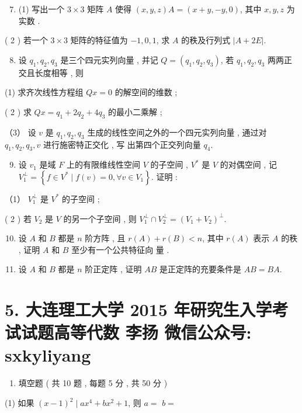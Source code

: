 \documentclass[10pt]{article}
\begin{document}
{\begin{enumerate}
  \setcounter{enumi}{6}
  \item (1)  写出一个  $3 \times 3$  矩阵  $A$  使得  $(x, y, z) A=(x+y,-y, 0)$,  其中  $x, y, z$  为实数 .
\end{enumerate}
( 2 )  若一个  $3 \times 3$  矩阵的特征值为  $-1,0,1$,  求  $A$  的秩及行列式  $|A+2 E|$.

\begin{enumerate}
  \setcounter{enumi}{7}
  \item  设  $q_{1}, q_{2}, q_{3}$  是三个四元实列向量 ,  并记  $Q=\left(q_{1}, q_{2}, q_{3}\right)$,  若  $q_{1}, q_{2}, q_{3}$  两两正交且长度相等 ,  则 
\end{enumerate}
(1)  求齐次线性方程组  $Q x=0$  的解空间的维数 ;

( 2 )  求  $Q x=q_{1}+2 q_{2}+4 q_{3}$  的最小二乘解 ;

（3） 设  $v$  是  $q_{1}, q_{2}, q_{3}$  生成的线性空间之外的一个四元实列向量 ,  通过对  $q_{1}, q_{2}, q_{3}, v$  进行施密特正交化 ,  写   出第四个正交列向量  $q_{4}$.

\begin{enumerate}
  \setcounter{enumi}{8}
  \item  设  $v_{1}$  是域  $F$  上的有限维线性空间  $V$  的子空间 , $V^{*}$  是  $V$  的对偶空间 ,  记  $V_{1}^{\perp}=\left\{f \in V^{*} \mid f(v)=0, \forall v \in V_{1}\right\}$.  证明 :
\end{enumerate}
（1） $V_{1}^{\perp}$  是  $V^{*}$  的子空间 ;

( 2 )  若  $V_{2}$  是  $V$  的另一个子空间 ,  则  $V_{1}^{\perp} \cap V_{2}^{\perp}=\left(V_{1}+V_{2}\right)^{\perp}$.

\begin{enumerate}
  \setcounter{enumi}{9}
  \item  设  $A$  和  $B$  都是  $n$  阶方阵 ,  且  $r(A)+r(B)<n$,  其中  $r(A)$  表示  $A$  的秩 ,  证明  $A$  和  $B$  至少有一个公共特征向   量 .

  \item  设  $A$  和  $B$  都是  $n$  阶正定阵 ,  证明  $A B$  是正定阵的充要条件是  $A B=B A$.

\end{enumerate}
\section{5. 大连理工大学 2015 年研究生入学考试试题高等代数 
 李扬 
 微信公众号: sxkyliyang}
\begin{enumerate}
  \item  填空题  ( 共  10  题 ,  每题  5  分 ,  共  50  分 )
\end{enumerate}
(1)  如果  $(x-1)^{2} \mid a x^{4}+b x^{2}+1$,  则  $a=$ $b=$

}
\end{document}

